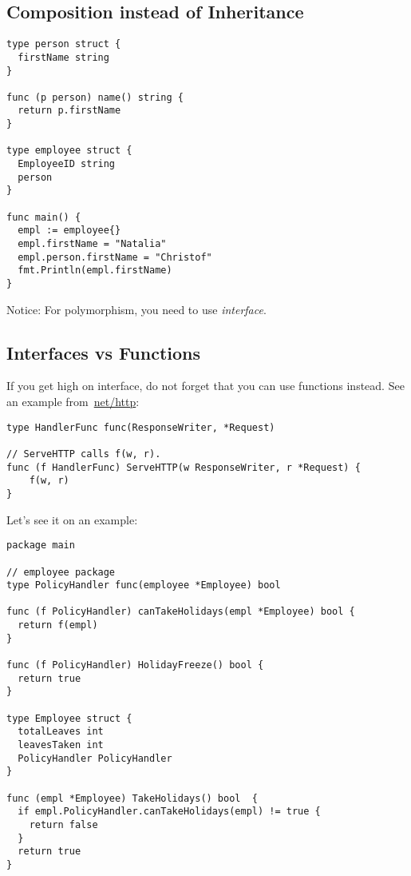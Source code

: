 \documentclass[11pt, letterpaper]{article}
\begin{document}
\subsection{Composition instead of Inheritance}

\begin{verbatim}
type person struct {
  firstName string
}

func (p person) name() string {
  return p.firstName
}

type employee struct {
  EmployeeID string
  person
}

func main() {
  empl := employee{}
  empl.firstName = "Natalia"
  empl.person.firstName = "Christof"
  fmt.Println(empl.firstName)
}
\end{verbatim}

Notice: For polymorphism, you need to use \emph{interface}.

\subsection{Interfaces vs Functions}

If you get high on interface, do not forget that you can use functions instead. See an example from~\href{https://golang.org/src/net/http/server.go}{net/http}:

\begin{verbatim}
type HandlerFunc func(ResponseWriter, *Request)

// ServeHTTP calls f(w, r).
func (f HandlerFunc) ServeHTTP(w ResponseWriter, r *Request) {
    f(w, r)
}
\end{verbatim}

Let's see it on an example:

\begin{verbatim}
package main

// employee package
type PolicyHandler func(employee *Employee) bool

func (f PolicyHandler) canTakeHolidays(empl *Employee) bool {
  return f(empl)
}

func (f PolicyHandler) HolidayFreeze() bool {
  return true
}

type Employee struct {
  totalLeaves int
  leavesTaken int
  PolicyHandler PolicyHandler
}

func (empl *Employee) TakeHolidays() bool  {
  if empl.PolicyHandler.canTakeHolidays(empl) != true {
    return false
  }
  return true
}
\end{verbatim}
\end{document}
